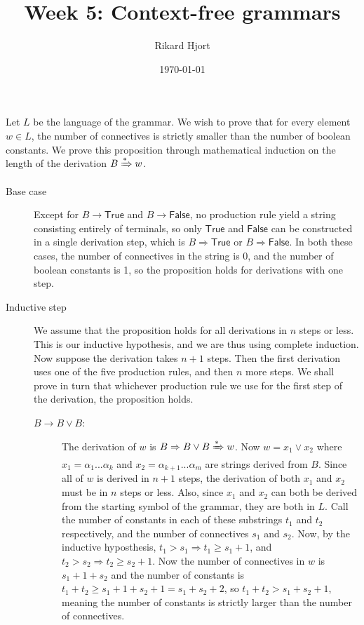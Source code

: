 \documentclass{article}
\title{Week 5: Context-free grammars}
\date{\today}
\author{Rikard Hjort}
\begin{document}
\maketitle

\section{}

Let $L$ be the language of the grammar. We wish to prove that for every element $w \in L$, the number of connectives is strictly smaller than the number of boolean constants. We prove this proposition through mathematical induction on the length of the derivation $B \xRightarrow{*} w$.

\begin{description}
    \item[Base case] Except for $B \to \mathsf{True}$ and $B \to \mathsf{False}$, no production rule yield a string consisting entirely of terminals, so only $\mathsf{True}$ and $\mathsf{False}$ can be constructed in a single derivation step, which is $B \Rightarrow \mathsf{True}$ or $B \Rightarrow \mathsf{False}$. In both these cases, the number of connectives in the string is 0, and the number of boolean constants is 1, so the proposition holds for derivations with one step.
    \item[Inductive step] We assume that the proposition holds for all derivations in $n$ steps or less. This is our inductive hypothesis, and we are thus using complete induction. Now suppose the derivation takes $n+1$ steps. Then the first derivation uses one of the five production rules, and then $n$ more steps. We shall prove in turn that whichever production rule we use for the first step of the derivation, the proposition holds.
        \begin{description}
            \item[$B \to B \lor B$:] The derivation of $w$ is $B \Rightarrow B \lor B \xRightarrow{*} w$. Now $w = x_1\lor x_2$ where $x_1 =\alpha_1...\alpha_k$ and $x_2=\alpha_{k+1}...\alpha_m$ are strings derived from $B$. Since all of $w$ is derived in $n+1$ steps, the derivation of both $x_1$ and $x_2$ must be in $n$ steps or less. Also, since $x_1$ and $x_2$ can both be derived from the starting symbol of the grammar, they are both in $L$. Call the number of constants in each of these substrings $t_1$ and $t_2$ respectively, and the number of connectives $s_1$ and $s_2$. Now, by the inductive hyposthesis, $t_1 > s_1 \Rightarrow t_1 \geq s_1+1$, and $t_2 > s_2 \Rightarrow t_2 \geq s_2+1$. Now the number of connectives in $w$ is $s_1 + 1 + s_2$ and the number of constants is $t_1 + t_2 \geq s_1 + 1 + s_2 + 1 = s_1 + s_2 + 2$, so $t_1 + t_2 > s_1 + s_2 + 1$, meaning the number of constants is strictly larger than the number of connectives.

\end{description}
\end{description}
\end{document}
